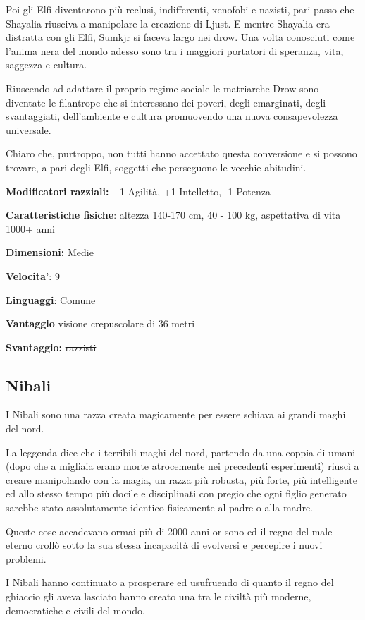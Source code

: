 \documentclass[a4paper,11pt,twoside,openany]{book}
\begin{document}
Poi gli Elfi diventarono più reclusi, indifferenti, xenofobi e nazisti, pari passo che Shayalia riusciva a manipolare la creazione di Ljust. E mentre Shayalia era distratta con gli Elfi, Sumkjr si faceva largo nei drow. Una volta conosciuti come l'anima nera del mondo adesso sono tra i maggiori portatori di speranza, vita, saggezza e cultura.

Riuscendo ad adattare il proprio regime sociale le matriarche Drow sono diventate le filantrope che si interessano dei poveri, degli emarginati, degli svantaggiati, dell'ambiente e cultura promuovendo una nuova consapevolezza universale.

Chiaro che, purtroppo, non tutti hanno accettato questa conversione e si possono trovare, a pari degli Elfi, soggetti che perseguono le vecchie abitudini.

\textbf{Modificatori razziali:} +1 Agilità, +1 Intelletto, -1 Potenza

\textbf{Caratteristiche fisiche}: altezza 140-170 cm, 40 - 100 kg,
aspettativa di vita 1000+ anni

\textbf{Dimensioni:} Medie

\textbf{Velocita'}: 9

\textbf{Linguaggi}: Comune

\textbf{Vantaggio} visione crepuscolare di 36 metri

\textbf{Svantaggio:} \sout{razzisti}

\subsection{Nibali}

\label{nibali}

I Nibali sono una razza creata magicamente per essere schiava ai grandi maghi del nord.

La leggenda dice che i terribili maghi del nord, partendo da una coppia di umani (dopo che a migliaia erano morte atrocemente nei precedenti esperimenti) riuscì a creare manipolando con la magia, un razza più robusta, più forte, più intelligente ed allo stesso tempo più docile e disciplinati con pregio che ogni figlio generato sarebbe stato assolutamente identico fisicamente al padre o alla madre.

Queste cose accadevano ormai più di 2000 anni or sono ed il regno del male eterno crollò sotto la sua stessa incapacità di evolversi e percepire i nuovi problemi.

I Nibali hanno continuato a prosperare ed usufruendo di quanto il regno del ghiaccio gli aveva lasciato hanno creato una tra le civiltà più moderne, democratiche e civili del mondo.
\end{document}
